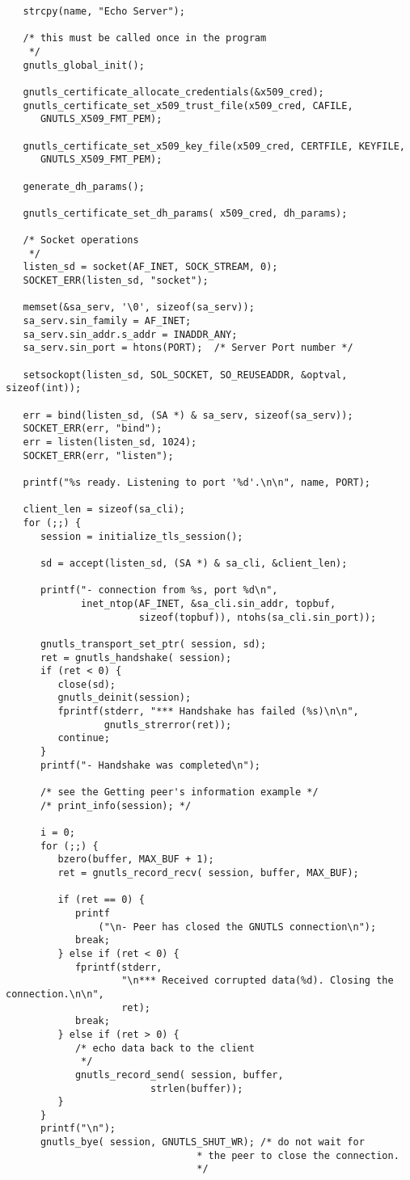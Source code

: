 \begin{verbatim}
   strcpy(name, "Echo Server");

   /* this must be called once in the program
    */
   gnutls_global_init();

   gnutls_certificate_allocate_credentials(&x509_cred);
   gnutls_certificate_set_x509_trust_file(x509_cred, CAFILE, 
      GNUTLS_X509_FMT_PEM);

   gnutls_certificate_set_x509_key_file(x509_cred, CERTFILE, KEYFILE, 
      GNUTLS_X509_FMT_PEM);

   generate_dh_params();
   
   gnutls_certificate_set_dh_params( x509_cred, dh_params);

   /* Socket operations
    */
   listen_sd = socket(AF_INET, SOCK_STREAM, 0);
   SOCKET_ERR(listen_sd, "socket");

   memset(&sa_serv, '\0', sizeof(sa_serv));
   sa_serv.sin_family = AF_INET;
   sa_serv.sin_addr.s_addr = INADDR_ANY;
   sa_serv.sin_port = htons(PORT);  /* Server Port number */

   setsockopt(listen_sd, SOL_SOCKET, SO_REUSEADDR, &optval, sizeof(int));

   err = bind(listen_sd, (SA *) & sa_serv, sizeof(sa_serv));
   SOCKET_ERR(err, "bind");
   err = listen(listen_sd, 1024);
   SOCKET_ERR(err, "listen");

   printf("%s ready. Listening to port '%d'.\n\n", name, PORT);

   client_len = sizeof(sa_cli);
   for (;;) {
      session = initialize_tls_session();

      sd = accept(listen_sd, (SA *) & sa_cli, &client_len);

      printf("- connection from %s, port %d\n",
             inet_ntop(AF_INET, &sa_cli.sin_addr, topbuf,
                       sizeof(topbuf)), ntohs(sa_cli.sin_port));

      gnutls_transport_set_ptr( session, sd);
      ret = gnutls_handshake( session);
      if (ret < 0) {
         close(sd);
         gnutls_deinit(session);
         fprintf(stderr, "*** Handshake has failed (%s)\n\n",
                 gnutls_strerror(ret));
         continue;
      }
      printf("- Handshake was completed\n");

      /* see the Getting peer's information example */
      /* print_info(session); */

      i = 0;
      for (;;) {
         bzero(buffer, MAX_BUF + 1);
         ret = gnutls_record_recv( session, buffer, MAX_BUF);

         if (ret == 0) {
            printf
                ("\n- Peer has closed the GNUTLS connection\n");
            break;
         } else if (ret < 0) {
            fprintf(stderr,
                    "\n*** Received corrupted data(%d). Closing the connection.\n\n",
                    ret);
            break;
         } else if (ret > 0) {
            /* echo data back to the client
             */
            gnutls_record_send( session, buffer,
                         strlen(buffer));
         }
      }
      printf("\n");
      gnutls_bye( session, GNUTLS_SHUT_WR); /* do not wait for
                                 * the peer to close the connection.
                                 */


\end{verbatim}
